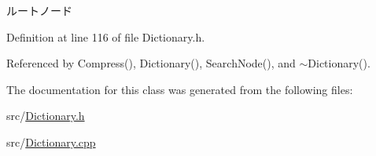 ルートノード 



Definition at line 116 of file Dictionary.\-h.



Referenced by Compress(), Dictionary(), Search\-Node(), and $\sim$\-Dictionary().



The documentation for this class was generated from the following files\-:\begin{DoxyCompactItemize}
\item 
src/\hyperlink{Dictionary_8h}{Dictionary.\-h}\item 
src/\hyperlink{Dictionary_8cpp}{Dictionary.\-cpp}\end{DoxyCompactItemize}
